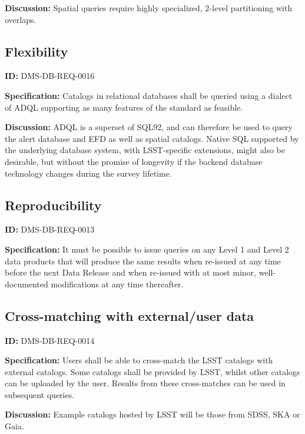 \documentclass[toc]{lsstdoc}
\begin{document}
\textbf{Discussion:}
Spatial queries require highly specialized, 2-level partitioning with overlaps.

\subsection{Flexibility}

\label{DMS-DB-REQ-0016}
\textbf{ID:} DMS-DB-REQ-0016

\textbf{Specification:}
Catalogs in relational databases shall be queried using a dialect of ADQL supporting as many features of the standard as feasible.

\textbf{Discussion:}
ADQL is a superset of SQL92, and can therefore be used to query the alert database and EFD as well as spatial catalogs. Native SQL supported by the underlying database system, with LSST-specific extensions, might also be desirable, but without the promise of longevity if the backend database technology changes during the survey lifetime.

\subsection{Reproducibility}

\label{DMS-DB-REQ-0013}
\textbf{ID:} DMS-DB-REQ-0013

\textbf{Specification:}
It must be possible to issue queries on any Level 1 and Level 2 data products that will produce the same results when re-issued at any time before the next Data Release and when re-issued with at most minor, well-documented modifications at any time thereafter.

\subsection{Cross-matching with external/user data}

\label{DMS-DB-REQ-0014}
\textbf{ID:} DMS-DB-REQ-0014

\textbf{Specification:}
Users shall be able to cross-match the LSST catalogs with external catalogs. Some catalogs shall be provided by LSST, whilst other catalogs can be uploaded by the user. Results from these cross-matches can be used in subsequent queries.

\textbf{Discussion:}
Example catalogs hosted by LSST will be those from SDSS, SKA or Gaia.


\end{document}
